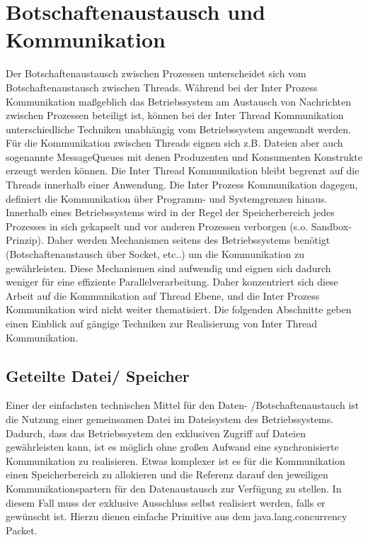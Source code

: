 \documentclass[12pt,oneside,a4paper,bibtotoc,liststotoc]{scrreprt}
\begin{document}
\section{Botschaftenaustausch und Kommunikation}
Der Botschaftenaustausch zwischen Prozessen unterscheidet sich vom Botschaftenaustausch zwischen Threads. Während bei der Inter Prozess Kommunikation maßgeblich das Betriebssystem am Austausch von Nachrichten zwischen Prozessen beteiligt ist, können bei der Inter Thread Kommunikation unterschiedliche Techniken unabhängig vom Betriebssystem angewandt werden. Für die Kommunikation zwischen Threads eignen sich z.B. Dateien aber auch sogenannte MessageQueues mit denen Produzenten und Konsumenten Konstrukte erzeugt werden können. Die Inter Thread Kommunikation bleibt begrenzt auf die Threads innerhalb einer Anwendung. Die Inter Prozess Kommunikation dagegen, definiert die Kommunikation über Programm- und Systemgrenzen hinaus. Innerhalb eines Betriebssystems wird in der Regel der Speicherbereich jedes Prozesses in sich gekapselt und vor anderen Prozessen verborgen (s.o. Sandbox-Prinzip). Daher werden Mechanismen seitens des Betriebssystems benötigt (Botschaftenaustausch über Socket, etc..) um die Kommunikation zu gewährleisten. Diese Mechanismen sind aufwendig und eignen sich dadurch weniger für eine effiziente Parallelverarbeitung. Daher konzentriert sich diese Arbeit auf die Kommunikation auf Thread Ebene, und die Inter Prozess Kommunikation wird nicht weiter thematisiert. Die folgenden Abschnitte geben einen Einblick auf gängige Techniken zur Realisierung von Inter Thread Kommunikation.

\subsection{Geteilte Datei/ Speicher}
Einer der einfachsten technischen Mittel für den Daten- /Botschaftenaustauch ist die Nutzung einer gemeinsamen Datei im Dateisystem des Betriebssystems. Dadurch, dass das Betriebssystem den exklusiven Zugriff auf Dateien gewährleisten kann, ist es möglich ohne großen Aufwand eine synchronisierte Kommunikation zu realisieren. Etwas komplexer ist es für die Kommunikation einen Speicherbereich zu allokieren und die Referenz darauf den jeweiligen Kommunikationspartern für den Datenaustausch zur Verfügung zu stellen. In diesem Fall muss der exklusive Ausschluss selbst realisiert werden, falls er gewünscht ist. Hierzu dienen einfache Primitive aus dem java.lang.concurrency Packet.
\end{document}

